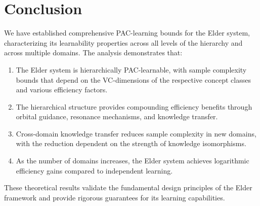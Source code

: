 \section{Conclusion}

We have established comprehensive PAC-learning bounds for the Elder system, characterizing its learnability properties across all levels of the hierarchy and across multiple domains. The analysis demonstrates that:

\begin{enumerate}
    \item The Elder system is hierarchically PAC-learnable, with sample complexity bounds that depend on the VC-dimensions of the respective concept classes and various efficiency factors.
    
    \item The hierarchical structure provides compounding efficiency benefits through orbital guidance, resonance mechanisms, and knowledge transfer.
    
    \item Cross-domain knowledge transfer reduces sample complexity in new domains, with the reduction dependent on the strength of knowledge isomorphisms.
    
    \item As the number of domains increases, the Elder system achieves logarithmic efficiency gains compared to independent learning.
\end{enumerate}

These theoretical results validate the fundamental design principles of the Elder framework and provide rigorous guarantees for its learning capabilities.